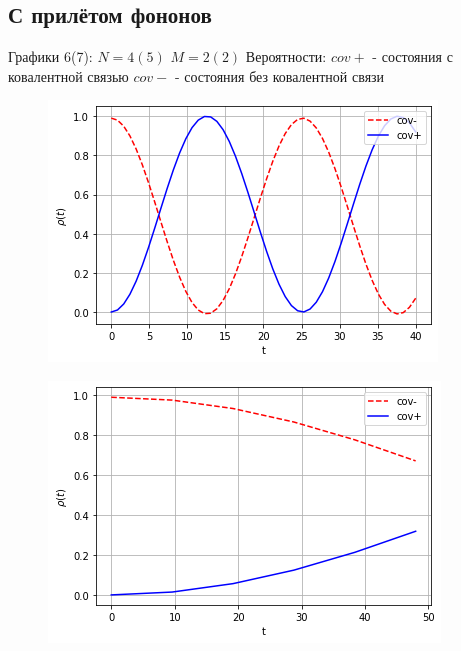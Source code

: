 \documentclass[12pt, a4paper]{article}
\begin{document}
\subsection{С прилётом фононов}
Графики 6(7):\newline
$N=4(5)$\newline
$M=2(2)$\newline
Вероятности:\newline
$cov+$ - состояния с ковалентной связью\newline
$cov-$ - состояния без ковалентной связи\newline
\null
\begin{figure}[htp]
\centering
\includegraphics[scale=0.70]{PLT3.png}
\caption{}
\label{}
\end{figure}
\begin{figure}[htp]
\centering
\includegraphics[scale=0.70]{PLT4.png}
\caption{}
\label{}
\end{figure}
\null
\newpage
\end{document}
